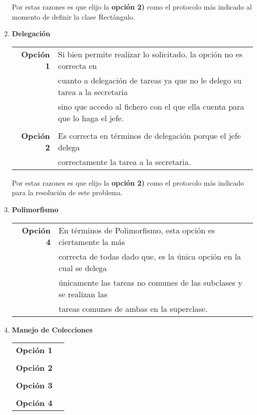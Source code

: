 \documentclass[a4paper,10pt]{article}
\begin{document}
\begin{enumerate}
            Por estas razones es que elijo la \textbf{opción 2)} como el protocolo más indicado al momento de definir la clase Rectángulo.
            
        \item \textbf{Delegación}
        
            \begin{tabular}{r|l}
                \textbf{Opción 1} &  Si bien permite realizar lo solicitado, la opción no es correcta en \\ 
                & cuanto a delegación de tareas ya que no le delego su tarea a la secretaria \\ 
                & sino que accedo al fichero con el que ella cuenta para que lo haga el jefe. \\
                & \\
                
                \textbf{Opción 2} & Es correcta en términos de delegación porque el jefe delega \\ 
                & correctamente la tarea a la secretaria. \\
            \end{tabular}
            
            Por estas razones es que elijo la \textbf{opción 2)} como el protocolo más indicado para la resolución de este problema.
            
        \item \textbf{Polimorfismo}
        
            \begin{tabular}{r|l}
                \textbf{Opción 4} &  En términos de Polimorfismo, esta opción es ciertamente la más \\
                & correcta de todas dado que, es la única opción en la cual se delega \\
                & únicamente las tareas no comunes de las subclases y se realizan las \\ 
                & tareas comunes de ambas en la superclase. \\
            \end{tabular}
            
        \item \textbf{Manejo de Colecciones}
        
            \begin{tabular}{r|l}
                \textbf{Opción 1} &  \\
                 & \\
                
                \textbf{Opción 2} &  \\
                 & \\
                 
                \textbf{Opción 3} &  \\
                 & \\
                 
                \textbf{Opción 4} &  \\
            \end{tabular}
    \end{enumerate}
\end{document}
